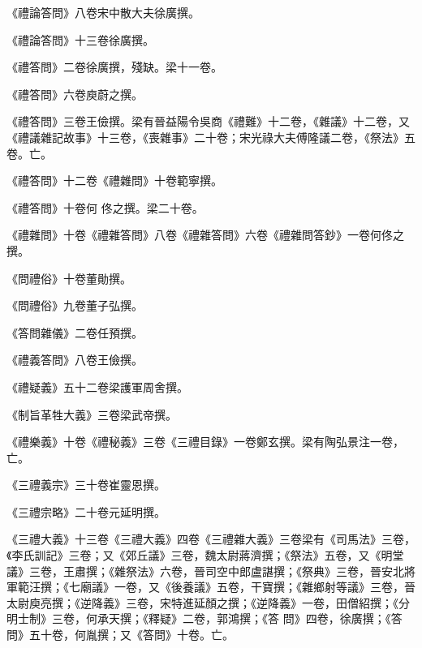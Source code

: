 \begin{pinyinscope}
 《禮論答問》八卷宋中散大夫徐廣撰。



 《禮論答問》十三卷徐廣撰。



 《禮答問》二卷徐廣撰，殘缺。梁十一卷。



 《禮答問》六卷庾蔚之撰。



 《禮答問》三卷王儉撰。梁有晉益陽令吳商《禮難》十二卷，《雜議》十二卷，又《禮議雜記故事》十三卷，《喪雜事》二十卷；宋光祿大夫傅隆議二卷，《祭法》五卷。亡。



 《禮答問》十二卷《禮雜問》十卷範寧撰。



 《禮答問》十卷何
 佟之撰。梁二十卷。



 《禮雜問》十卷《禮雜答問》八卷《禮雜答問》六卷《禮雜問答鈔》一卷何佟之撰。



 《問禮俗》十卷董勛撰。



 《問禮俗》九卷董子弘撰。



 《答問雜儀》二卷任預撰。



 《禮義答問》八卷王儉撰。



 《禮疑義》五十二卷梁護軍周舍撰。



 《制旨革牲大義》三卷梁武帝撰。



 《禮樂義》十卷《禮秘義》三卷《三禮目錄》一卷鄭玄撰。梁有陶弘景注一卷，亡。



 《三禮義宗》三十卷崔靈恩撰。



 《三禮宗略》二十卷元延明撰。



 《三禮大義》十三卷《三禮大義》四卷《三禮雜大義》三卷梁有《司馬法》三卷，《李氏訓記》三卷；又《郊丘議》三卷，魏太尉蔣濟撰；《祭法》五卷，又《明堂議》三卷，王肅撰；《雜祭法》六卷，晉司空中郎盧諶撰；《祭典》三卷，晉安北將軍範汪撰；《七廟議》一卷，又《後養議》五卷，干寶撰；《雜鄉射等議》三卷，晉太尉庾亮撰；《逆降義》三卷，宋特進延顏之撰；《逆降義》一卷，田僧紹撰；《分明士制》三卷，何承天撰；《釋疑》二卷，郭鴻撰；《答
 問》四卷，徐廣撰；《答問》五十卷，何胤撰；又《答問》十卷。亡。




\end{pinyinscope}

